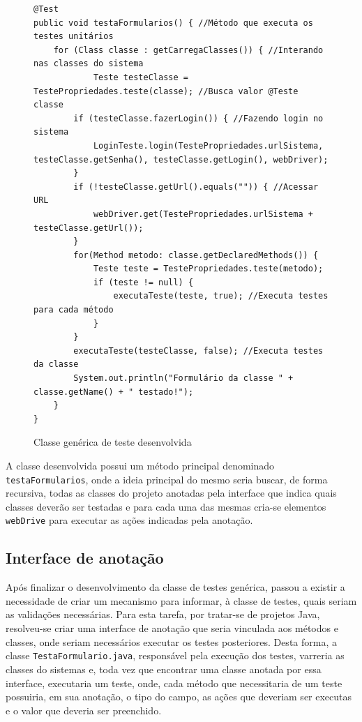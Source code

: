 \documentclass[tg]{mdtufsm}
\begin{document}
\begin{figure}[!htb]
\begin{lstlisting}
@Test
public void testaFormularios() { //Método que executa os testes unitários
	for (Class classe : getCarregaClasses()) { //Interando nas classes do sistema
    		Teste testeClasse = TestePropriedades.teste(classe); //Busca valor @Teste classe
        if (testeClasse.fazerLogin()) { //Fazendo login no sistema
            LoginTeste.login(TestePropriedades.urlSistema, testeClasse.getSenha(), testeClasse.getLogin(), webDriver);
        }
        if (!testeClasse.getUrl().equals("")) { //Acessar URL
            webDriver.get(TestePropriedades.urlSistema + testeClasse.getUrl());
        }
        for(Method metodo: classe.getDeclaredMethods()) {
            Teste teste = TestePropriedades.teste(metodo);
            if (teste != null) {
                executaTeste(teste, true); //Executa testes para cada método
            }
        }
        executaTeste(testeClasse, false); //Executa testes da classe
        System.out.println("Formulário da classe " + classe.getName() + " testado!");
	}
}
\end{lstlisting}
    \caption{Classe genérica de teste desenvolvida}
	\label{code:TestaFormularios.java}
\end{figure}

A classe desenvolvida possui um método principal denominado \texttt{testaFormularios}, onde a ideia principal do mesmo seria buscar,
de forma recursiva, todas as classes do projeto anotadas pela interface que indica quais classes deverão ser testadas e para cada uma das mesmas cria-se elementos \texttt{webDrive} para executar as ações indicadas pela anotação.

\subsection{Interface de anotação}

Após finalizar o desenvolvimento da classe de testes genérica, passou a existir a necessidade de criar um mecanismo para informar, à classe de testes, quais seriam as validações necessárias. Para esta tarefa,
por tratar-se de projetos Java, resolveu-se criar uma interface de anotação que seria vinculada aos métodos e classes, onde seriam necessários executar os testes posteriores. Desta forma, a classe \texttt{TestaFormulario.java},
responsável pela execução dos testes, varreria as classes do sistemas e, toda vez que encontrar uma classe anotada por essa interface, executaria um teste, onde, cada método que necessitaria de um teste possuiria, em sua anotação, o tipo do campo,
as ações que deveriam ser executas e o valor que deveria ser preenchido.
\end{document}
